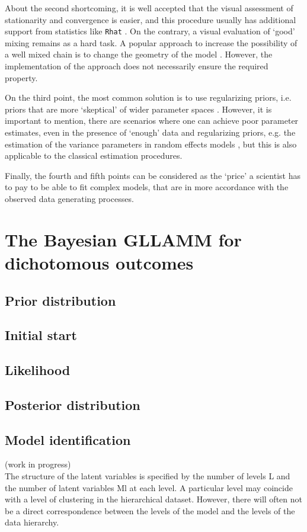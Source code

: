 About the second shortcoming, it is well accepted that the visual assessment of stationarity and convergence is easier, and this procedure usually has additional support from statistics like \texttt{Rhat} \cite{Gelman_et_al_2014}. On the contrary, a visual evaluation of `good' mixing remains as a hard task. A popular approach to increase the possibility of a well mixed chain is to change the geometry of the model \cite{McElreath_2020}. However, the implementation of the approach does not necessarily ensure the required property.

On the third point, the most common solution is to use regularizing priors, i.e. priors that are more `skeptical' of wider parameter spaces \cite{McElreath_2020}. However, it is important to mention, there are scenarios where one can achieve poor parameter estimates, even in the presence of `enough' data and regularizing priors, e.g. the estimation of the variance parameters in random effects models \cite{Skrondal_et_al_2004a}, but this is also applicable to the classical estimation procedures.

Finally, the fourth and fifth points can be considered as the `price' a scientist has to pay to be able to fit complex models, that are in more accordance with the observed data generating processes.


\section{The Bayesian GLLAMM for dichotomous outcomes}

\subsection{Prior distribution}

\subsection{Initial start}

\subsection{Likelihood}

\subsection{Posterior distribution}


\subsection{Model identification} \label{sect:identification}
{\color{red}(work in progress) \\
	
	The structure of the latent variables is specified by the number of levels L and the number of latent variables Ml at each level. A particular level may coincide with a level of clustering in the hierarchical dataset. However, there will often not be a direct correspondence between the levels of the model and the levels of the data hierarchy.
	
}


